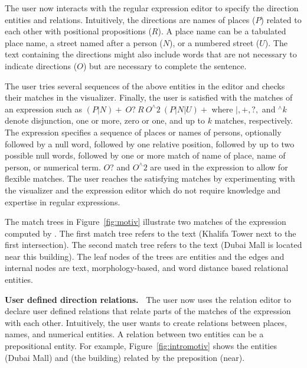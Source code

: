 The user now interacts with the regular expression editor to 
specify the direction entities and relations.
Intuitively, 
the directions are names of places ($P$) related to each other with 
positional propositions ($R$). 
A place name can be a tabulated place name, a street named after 
a person ($N$), or a numbered street ($U$). 
The text containing the directions might also include words that are not 
necessary to indicate directions ($O$)
but are necessary to complete the sentence. 

The user tries several sequences of the above entities in the 
editor and checks their matches in the visualizer. 
Finally, the user is satisfied with the matches of an expression such as 
$(P|N)\!+~O?~R~O^\wedge\!2~(P|N|U)+$ where 
$|,+,?,$ and $^\wedge k$ denote disjunction, one or more, zero or one, and
up to $k$ matches, respectively.
The expression specifies a sequence of places or names of persons, 
optionally followed by a null word, 
followed by one relative position, followed by up to two possible null words, 
followed by one or more match of name of place, name of person, or numerical term. 
$O?$ and $O^\wedge 2$ are used in the expression to allow for flexible matches.
The user reaches the satisfying matches by experimenting with the visualizer and the expression editor which do not require knowledge and expertise in regular expressions. 

The match trees in Figure~\ref{fig:motiv} illustrate two matches of the expression 
computed by \framework.
The first match tree refers to the text 
(Khalifa Tower next to the first intersection). 
The second match tree refers to the text 
(Dubai Mall is located near this building).
The leaf nodes of the trees are entities and the edges and internal nodes are text, 
morphology-based, 
and word distance based relational entities. 

{\bf User defined direction relations.~}
The user now uses the relation editor to declare user defined relations that relate 
parts of the matches of the expression with each other. 
Intuitively, 
the user wants to create relations between places, names, and numerical entities. 
A relation between two entities can be a prepositional entity.
For example, Figure~\ref{fig:intromotiv} shows the entities (Dubai Mall) and 
(the building) related by the preposition (near).

